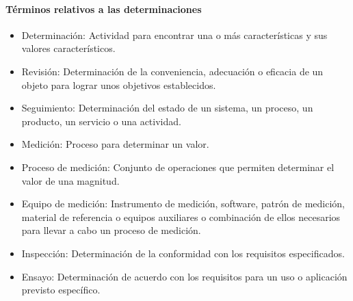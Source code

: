 					\paragraph{Términos relativos a las determinaciones}
						
						\begin{itemize}
							\item Determinación: Actividad para encontrar una o más características y sus valores característicos.
							
							\item Revisión: Determinación de la conveniencia, adecuación o eficacia de un objeto para lograr unos objetivos establecidos.
							
							\item Seguimiento: Determinación del estado de un sistema, un proceso, un producto, un
							servicio o una actividad.
							
							\item Medición: Proceso para determinar un valor.
							
							\item Proceso de medición: Conjunto de operaciones que permiten determinar el valor de una magnitud.
							
							\item Equipo de medición: Instrumento de medición, software, patrón de medición, material de referencia o equipos auxiliares o
							combinación de ellos necesarios para llevar a cabo un proceso de medición.
							
							\item Inspección: Determinación de la conformidad con los requisitos  especificados.
							
							\item Ensayo: Determinación de acuerdo con los requisitos para un uso o aplicación previsto
							específico.
						\end{itemize}
					
